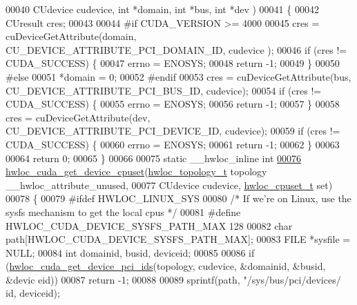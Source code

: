 \begin{DoxyCode}
00040                                CUdevice cudevice, \textcolor{keywordtype}{int} *domain, \textcolor{keywordtype}{int} *bus, \textcolor{keywordtype}{int} *dev
      )
00041 \{
00042   CUresult cres;
00043 
00044 \textcolor{preprocessor}{#if CUDA\_VERSION >= 4000}
00045 \textcolor{preprocessor}{}  cres = cuDeviceGetAttribute(domain, CU\_DEVICE\_ATTRIBUTE\_PCI\_DOMAIN\_ID, cudevice
      );
00046   \textcolor{keywordflow}{if} (cres != CUDA\_SUCCESS) \{
00047     errno = ENOSYS;
00048     \textcolor{keywordflow}{return} -1;
00049   \}
00050 \textcolor{preprocessor}{#else}
00051 \textcolor{preprocessor}{}  *domain = 0;
00052 \textcolor{preprocessor}{#endif}
00053 \textcolor{preprocessor}{}  cres = cuDeviceGetAttribute(bus, CU\_DEVICE\_ATTRIBUTE\_PCI\_BUS\_ID, cudevice);
00054   \textcolor{keywordflow}{if} (cres != CUDA\_SUCCESS) \{
00055     errno = ENOSYS;
00056     \textcolor{keywordflow}{return} -1;
00057   \}
00058   cres = cuDeviceGetAttribute(dev, CU\_DEVICE\_ATTRIBUTE\_PCI\_DEVICE\_ID, cudevice);
00059   \textcolor{keywordflow}{if} (cres != CUDA\_SUCCESS) \{
00060     errno = ENOSYS;
00061     \textcolor{keywordflow}{return} -1;
00062   \}
00063 
00064   \textcolor{keywordflow}{return} 0;
00065 \}
00066 
00075 \textcolor{keyword}{static} \_\_hwloc\_inline \textcolor{keywordtype}{int}
\hypertarget{a00028_source_l00076}{}\hyperlink{a00071_gae06cf330d2f0d9949feb52b146b7d136}{00076} \hyperlink{a00071_gae06cf330d2f0d9949feb52b146b7d136}{hwloc_cuda_get_device_cpuset}(\hyperlink{a00039_ga9d1e76ee15a7dee158b786c30b6a6e38}{hwloc_topology_t} topology \_\_hwloc\_attribute\_unused,
00077                              CUdevice cudevice, \hyperlink{a00040_ga4bbf39b68b6f568fb92739e7c0ea7801}{hwloc_cpuset_t} \textcolor{keyword}{set})
00078 \{
00079 \textcolor{preprocessor}{#ifdef HWLOC\_LINUX\_SYS}
00080 \textcolor{preprocessor}{}  \textcolor{comment}{/* If we're on Linux, use the sysfs mechanism to get the local cpus */}
00081 \textcolor{preprocessor}{#define HWLOC\_CUDA\_DEVICE\_SYSFS\_PATH\_MAX 128}
00082 \textcolor{preprocessor}{}  \textcolor{keywordtype}{char} path[HWLOC\_CUDA\_DEVICE\_SYSFS\_PATH\_MAX];
00083   FILE *sysfile = NULL;
00084   \textcolor{keywordtype}{int} domainid, busid, deviceid;
00085 
00086   \textcolor{keywordflow}{if} (\hyperlink{a00071_gae45c92fbc7ac538cf69fdfcc73994ed9}{hwloc_cuda_get_device_pci_ids}(topology, cudevice, &domainid, &busid, &devic
      eid))
00087     \textcolor{keywordflow}{return} -1;
00088 
00089   sprintf(path, \textcolor{stringliteral}{"/sys/bus/pci/devices/%
      id, deviceid);
}
\end{DoxyCode}
